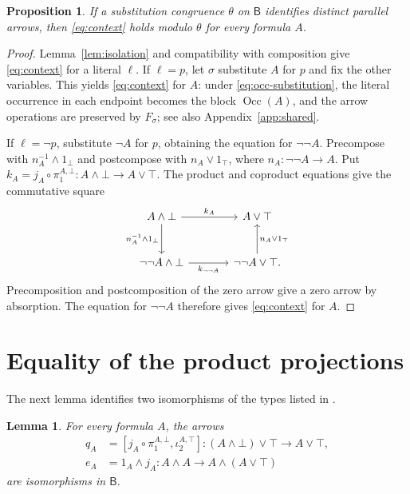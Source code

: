 \documentclass[11pt]{article}
\newtheorem{lemma}[theorem]{Lemma}
\newtheorem{proposition}[theorem]{Proposition}
\newcommand{\B}{\mathsf B}
\newcommand{\Occ}{\operatorname{Occ}}
\begin{document}
\begin{proposition}\label{prop:all-contexts}
If a substitution congruence $\theta$ on $\B$ identifies distinct
parallel arrows, then \eqref{eq:context} holds modulo $\theta$ for
every formula $A$.
\end{proposition}

\begin{proof}
Lemma~\ref{lem:isolation} and compatibility with composition give
\eqref{eq:context} for a literal $\ell$.
If $\ell=p$, let $\sigma$ substitute $A$ for $p$ and fix the other variables.
This yields \eqref{eq:context} for $A$: under
\eqref{eq:occ-substitution}, the literal occurrence in each endpoint
becomes the block $\Occ(A)$, and the arrow operations are preserved
by $F_\sigma$; see also Appendix~\ref{app:shared}.

If $\ell=\neg p$, substitute $\neg A$ for $p$, obtaining the equation
for $\neg\neg A$. Precompose with
$n_A^{-1}\wedge1_\bot$ and postcompose with $n_A\vee1_\top$,
where $n_A:\neg\neg A\to A$.
Put
$k_A=j_A\circ\pi_1^{A,\bot}:A\wedge\bot\to A\vee\top$.
The product and coproduct equations give the commutative square
\[
\begin{tikzcd}[column sep=large,row sep=large]
 A\wedge\bot\arrow[r,"k_A"]\arrow[d,"n_A^{-1}\wedge1_\bot"']
   &A\vee\top\\
 \neg\neg A\wedge\bot\arrow[r,"k_{\neg\neg A}"']
   &\neg\neg A\vee\top\arrow[u,"n_A\vee1_\top"'].
\end{tikzcd}
\]
Precomposition and postcomposition of the zero arrow give a zero
arrow by absorption. The equation for $\neg\neg A$ therefore gives
\eqref{eq:context} for $A$.
\end{proof}

\section{Equality of the product projections}\label{sec:collapse}

The next lemma identifies two isomorphisms of the types listed in
\cite[\S12.5, p.~294]{DP}.

\begin{lemma}\label{lem:structural-isos}
For every formula $A$, the arrows
\[
 \begin{aligned}
 q_A&=[j_A\circ\pi_1^{A,\bot},\iota_2^{A,\top}]
      :(A\wedge\bot)\vee\top\longrightarrow A\vee\top,\\
 e_A&=1_A\wedge j_A
      :A\wedge A\longrightarrow A\wedge(A\vee\top)
 \end{aligned}
\]
are isomorphisms in $\B$.
\end{lemma}
\end{document}
